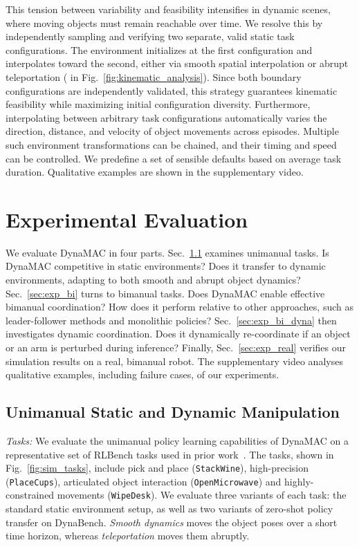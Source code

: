 \documentclass[letterpaper, 10 pt, journal, twoside]{IEEEtran}
\renewcommand{\secref}[1]{Sec.~\ref{#1}}
\renewcommand{\figref}[1]{Fig.~\ref{#1}}
\newcommand{\para}[1]{\parskip=5pt\noindent\textit{#1}}
\newcommand{\ourmethod}{DynaMAC\xspace}
\newcommand{\ourbench}{DynaBench\xspace}
\begin{document}
This tension between variability and feasibility intensifies in dynamic scenes, where moving objects must remain reachable over time.
We resolve this by independently sampling and verifying two separate, valid static task configurations.
The environment initializes at the first configuration and interpolates toward the second, either via smooth spatial interpolation or abrupt teleportation ( in \figref{fig:kinematic_analysis}).
Since both boundary configurations are independently validated, this strategy guarantees kinematic feasibility while maximizing initial configuration diversity.
%
%
%
%
%
%
%
Furthermore, interpolating between arbitrary task configurations automatically varies the direction, distance, and velocity of object movements across episodes.
Multiple such environment transformations can be chained, and their timing and speed can be controlled.
We predefine a set of sensible defaults based on average task duration.
Qualitative examples are shown in the supplementary video.

\section{Experimental Evaluation}\label{sec:exp}
We evaluate \ourmethod{} in four parts.
%
\secref{sec:exp_uni} examines unimanual tasks. Is \ourmethod{} competitive in static environments? Does it transfer to dynamic environments, adapting to both smooth and abrupt object dynamics?
%
\secref{sec:exp_bi} turns to bimanual tasks. Does \ourmethod{} enable effective bimanual coordination?
How does it perform relative to other approaches, such as leader-follower methods and monolithic policies?
%
\secref{sec:exp_bi_dyna} then investigates dynamic coordination.
%
Does it dynamically re-coordinate if an object or an arm is perturbed during inference?
Finally, \secref{sec:exp_real} verifies our simulation results on a real, bimanual robot.
The supplementary video analyses qualitative examples, including failure cases, of our experiments.

\subsection{Unimanual Static and Dynamic Manipulation}\label{sec:exp_uni}
\para{Tasks: }
We evaluate the unimanual policy learning capabilities of \ourmethod{} on a representative set of RLBench tasks used in prior work~\cite{von2025unreasonable}.
The tasks, shown in \figref{fig:sim_tasks}, include pick and place (\texttt{StackWine}), high-precision (\texttt{PlaceCups}), articulated object interaction (\texttt{OpenMicrowave}) and highly-constrained movements (\texttt{WipeDesk}).
We evaluate three variants of each task: the standard static environment setup, as well as two variants of zero-shot policy transfer on \ourbench.
\textit{Smooth dynamics} moves the object poses over a short time horizon, whereas \textit{teleportation} moves them abruptly.
\end{document}
